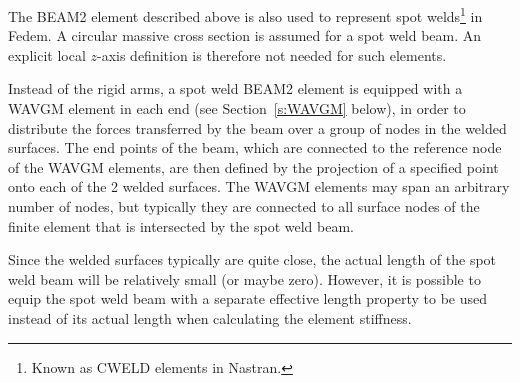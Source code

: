 The BEAM2 element described above is also used to represent spot welds\footnote{
Known as CWELD elements in Nastran.} in Fedem.
A circular massive cross section is assumed for a spot weld beam.
An explicit local $z$-axis definition is therefore not needed for such elements.

Instead of the rigid arms, a spot weld BEAM2 element is equipped with a WAVGM
element in each end (see Section~\ref{s:WAVGM} below), in order to distribute
the forces transferred by the beam over a group of nodes in the welded surfaces.
The end points of the beam, which are connected to the reference node of the
WAVGM elements, are then defined by the projection of a specified point
onto each of the 2 welded surfaces.
The WAVGM elements may span an arbitrary number of nodes, but typically they
are connected to all surface nodes of the finite element that is intersected by
the spot weld beam.

Since the welded surfaces typically are quite close, the actual length
of the spot weld beam will be relatively small (or maybe zero).
However, it is possible to equip the spot weld beam with a separate effective
length property to be used instead of its actual length when calculating the
element stiffness.
